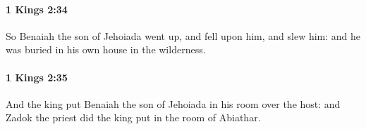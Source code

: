 		\paragraph{1 Kings 2:34} %
			\label{1KINGS-2-34}

			So Benaiah the son of Jehoiada went up, and fell upon him, and slew him: and he was buried in his own house in the wilderness.


		\paragraph{1 Kings 2:35} %
			\label{1KINGS-2-35}

			And the king put Benaiah the son of Jehoiada in his room over the host: and Zadok the priest did the king put in the room of Abiathar.



